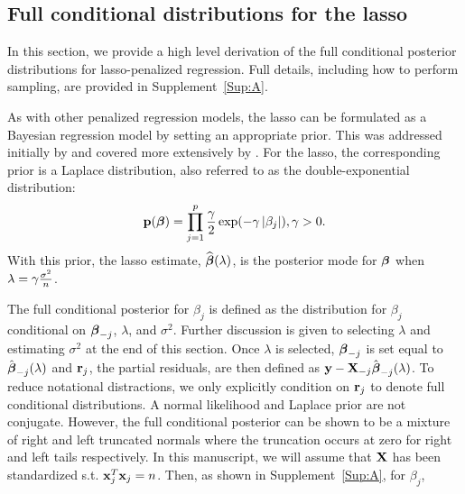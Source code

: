 \subsection{Full conditional distributions for the lasso}
\label{Sec:full-cond}


In this section, we provide a high level derivation of the full conditional posterior distributions for lasso-penalized regression. Full details, including how to perform sampling, are provided in Supplement~\ref{Sup:A}.

As with other penalized regression models, the lasso can be formulated as a Bayesian regression model by setting an appropriate prior. This was addressed initially by \cite{Tibshirani1996} and covered more extensively by \cite{Park2008}. For the lasso, the corresponding prior is a Laplace distribution, also referred to as the double-exponential distribution: $$\mathbf{p}(\boldsymbol{\beta}) = \prod_{j = 1}^{p} \frac{\gamma}{2}\exp(-\gamma \left\lvert\beta_j\right\rvert), \gamma > 0.$$ With this prior, the lasso estimate, $\widehat{\boldsymbol{\beta}}(\lambda)$, is the posterior mode for $\boldsymbol{\beta}$ when $\lambda = \gamma \frac{\sigma^2}{n}$.

The full conditional posterior for $\beta_j$ is defined as the distribution for $\beta_j$ conditional on $\boldsymbol{\beta}_{-j}$, $\lambda$, and $\sigma^2$. Further discussion is given to selecting $\lambda$ and estimating $\sigma^2$ at the end of this section. Once $\lambda$ is selected, $\boldsymbol{\beta}_{-j}$ is set equal to $\hat{\boldsymbol{\beta}}_{-j}(\lambda)$ and $\mathbf{r}_{j}$, the partial residuals, are then defined as $\mathbf{y} - \mathbf{X}_{-j}\hat{\boldsymbol{\beta}}_{-j}(\lambda)$. To reduce notational distractions, we only explicitly condition on $\mathbf{r}_{j}$ to denote full conditional distributions. A normal likelihood and Laplace prior are not conjugate. However, the full conditional posterior can be shown to be a mixture of right and left truncated normals where the truncation occurs at zero for right and left tails respectively. In this manuscript, we will assume that $\mathbf{X}$ has been standardized s.t. $\mathbf{x}_j^T\mathbf{x}_j = n$. Then, as shown in Supplement~\ref{Sup:A}, for $\beta_j$,


